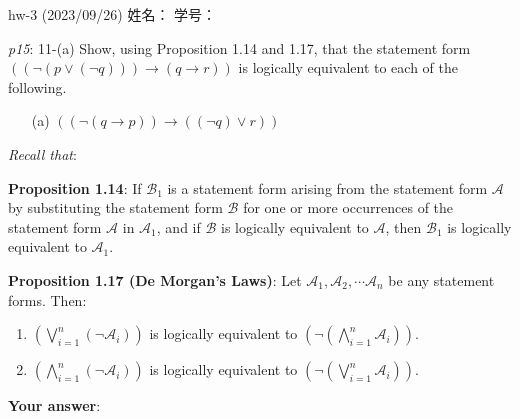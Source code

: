 \documentclass[UTF8,12pt,a4paper]{ctexart}
\begin{document}
	

\begin{center}
hw-3 (2023/09/26) \qquad\qquad 姓名：  \hspace{7em}  学号： 
\end{center}



\emph{p15}: 11-(a) \qquad
Show, using Proposition 1.14 and 1.17, that the statement form   \\
$(  (\neg (p \lor (\neg q)))  \to  (q \to r) )$
is logically equivalent to each of the following.

\begin{enumerate}
	\item[(a)] $ ( (\neg (q \to p)) \to ((\neg q) \lor r )) $
\end{enumerate}


\dotfill
\textit{Recall that}:
\dotfill

{\small 
	\textbf{Proposition 1.14}:
If $\mathscr{B}_1$ is a statement form arising from the statement form $\mathscr{A}$ 
by substituting the statement form $\mathscr{B}$ for one or more occurrences of the
statement form $\mathscr{A}$ in $\mathscr{A}_1$, 
and if $\mathscr{B}$ is logically equivalent to $\mathscr{A}$, 
then $\mathscr{B}_1$ is logically equivalent to $\mathscr{A}_1$.

	\textbf{Proposition 1.17 (De Morgan's Laws)}: 
Let $\mathscr{A}_1, \mathscr{A}_2, \dotsm \mathscr{A}_n$ be any statement forms. Then:
\begin{enumerate}
	\item $(\bigvee^n_{i=1} (\neg \mathscr{A}_i))$ is logically equivalent to $( \neg (\bigwedge^n_{i=1} \mathscr{A}_i))$.
	
	\item $(\bigwedge^n_{i=1} ( \neg \mathscr{A}_i))$  is logically equivalent to  $(\neg (\bigvee^n_{i=1} \mathscr{A}_i))$.
\end{enumerate}
}

\dotfill


\textbf{Your answer}:
















\end{document}
